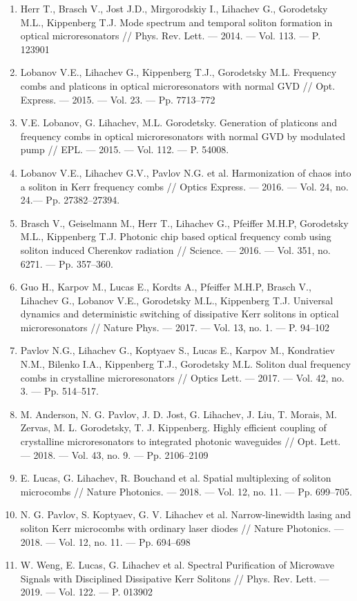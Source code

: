 \begin{enumerate}[label=\sbscript{A}{{\arabic*}}.]
  \item Herr T., Brasch V., Jost J.D., Mirgorodskiy I., Lihachev G., Gorodetsky M.L., Kippenberg T.J. Mode spectrum and temporal soliton formation in optical microresonators // Phys. Rev. Lett. — 2014. — Vol. 113. — P. 123901
  \item Lobanov V.E., Lihachev G., Kippenberg T.J., Gorodetsky M.L. Frequency combs and platicons in optical microresonators with normal GVD // Opt. Express. — 2015. — Vol. 23. — Pp. 7713–772
  \item V.E. Lobanov, G. Lihachev, M.L. Gorodetsky. Generation of platicons and frequency combs in optical microresonators with normal GVD by modulated pump // EPL. — 2015. — Vol. 112. — P. 54008.
  \item Lobanov V.E., Lihachev G.V., Pavlov N.G. et al. Harmonization of chaos into a soliton in Kerr frequency combs // Optics Express. — 2016. — Vol. 24, no. 24.— Pp. 27382–27394.
  \item Brasch V., Geiselmann M., Herr T., Lihachev G., Pfeiffer M.H.P, Gorodetsky M.L., Kippenberg T.J. Photonic chip based optical frequency comb using soliton induced Cherenkov radiation // Science. — 2016. — Vol. 351, no. 6271. — Pp. 357–360.
  \item Guo H., Karpov M., Lucas E., Kordts A., Pfeiffer M.H.P, Brasch V., Lihachev G., Lobanov V.E., Gorodetsky M.L., Kippenberg T.J. Universal dynamics and deterministic switching of dissipative Kerr solitons in optical microresonators // Nature Phys. — 2017. — Vol. 13, no. 1. — P. 94–102
  \item Pavlov N.G., Lihachev G., Koptyaev S., Lucas E., Karpov M., Kondratiev N.M., Bilenko I.A., Kippenberg T.J., Gorodetsky M.L. Soliton dual frequency combs in crystalline microresonators // Optics Lett. — 2017. — Vol. 42, no. 3. — Pp. 514–517.
  \item M. Anderson, N. G. Pavlov, J. D. Jost, G. Lihachev, J. Liu, T. Morais, M. Zervas, M. L. Gorodetsky, T. J. Kippenberg. Highly efficient coupling of crystalline microresonators to integrated photonic waveguides // Opt. Lett. — 2018. — Vol. 43, no. 9. — Pp. 2106–2109
  \item E. Lucas, G. Lihachev, R. Bouchand et al. Spatial multiplexing of soliton microcombs // Nature Photonics. — 2018. — Vol. 12, no. 11. — Pp. 699–705.
  \item N. G. Pavlov, S. Koptyaev, G. V. Lihachev et al. Narrow-linewidth lasing and soliton Kerr microcombs with ordinary laser diodes // Nature Photonics. — 2018. — Vol. 12, no. 11. — Pp. 694–698
  \item W. Weng, E. Lucas, G. Lihachev et al.  Spectral Purification of Microwave Signals with Disciplined Dissipative Kerr Solitons // Phys. Rev. Lett. — 2019. — Vol. 122. — P. 013902
\end{enumerate}



